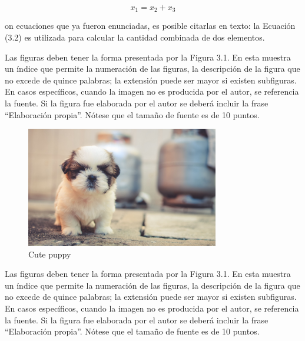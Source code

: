 \begin{equation}
	x_1 = x_2 + x_3
\end{equation}

on ecuaciones que ya fueron enunciadas, es posible citarlas en texto: la Ecuación (3.2) es utilizada para calcular la cantidad combinada de dos elementos.

Las figuras deben tener la forma presentada por la Figura 3.1. En esta muestra un índice que permite la numeración de las figuras, la descripción de la figura que no excede de quince palabras; la extensión puede ser mayor si existen subfiguras. En casos específicos, cuando la imagen no es producida por el autor, se referencia la fuente. Si la figura fue elaborada por el autor se deberá incluir la frase “Elaboración propia”. Nótese que el tamaño de fuente es de 10 puntos.

\begin{figure}
	\centering
	\includegraphics[width=0.75\textwidth]{images/puppy_dog_cute.jpg}
	\caption{Cute puppy}
	\label{pics:Puppy}
\end{figure}


Las figuras deben tener la forma presentada por la Figura 3.1. En esta muestra un índice que permite la numeración de las figuras, la descripción de la figura que no excede de quince palabras; la extensión puede ser mayor si existen subfiguras. En casos específicos, cuando la imagen no es producida por el autor, se referencia la fuente. Si la figura fue elaborada por el autor se deberá incluir la frase “Elaboración propia”. Nótese que el tamaño de fuente es de 10 puntos.

